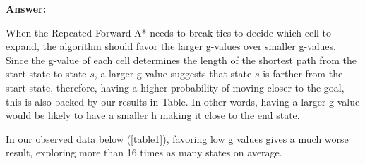\documentclass{article}
\begin{document}
{\color{blue} \textbf{Answer:}

When the Repeated Forward A* needs to break ties to decide which cell to expand, the algorithm should favor the larger g-values over smaller g-values. Since the g-value of each cell determines the length of the shortest path from the start state to state $s$, a larger g-value suggests that state $s$ is farther from the start state, therefore, having a higher probability of moving closer to the goal, this is also backed by our results in Table. In other words, having a larger g-value would be likely to have a smaller h making it close to the end state. 

In our observed data below (\ref{table1}), favoring low g values gives a much worse result, exploring more than 16 times as many states on average.
}
\begin{center}
    

\end{center}
\end{document}
